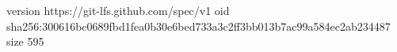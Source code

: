 version https://git-lfs.github.com/spec/v1
oid sha256:300616bc0689fbd1fea0b30e6bed733a3c2ff3bb013b7ac99a584ec2ab234487
size 595

